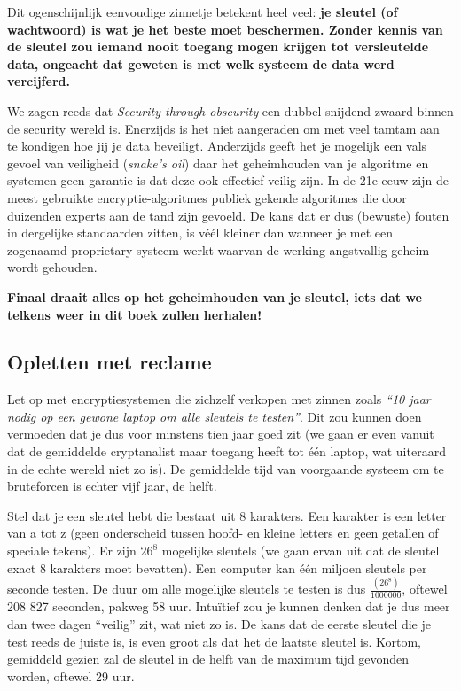\documentclass[
  10pt,
  dutch,
  paper=a4,
  ,captions=tableheading
]{scrbook}
\begin{document}
Dit ogenschijnlijk eenvoudige zinnetje betekent heel veel: \textbf{je
sleutel (of wachtwoord) is wat je het beste moet beschermen. Zonder
kennis van de sleutel zou iemand nooit toegang mogen krijgen tot
versleutelde data, ongeacht dat geweten is met welk systeem de data werd
vercijferd.}

We zagen reeds dat \emph{Security through obscurity} een dubbel snijdend
zwaard binnen de security wereld is. Enerzijds is het niet aangeraden om
met veel tamtam aan te kondigen hoe jij je data beveiligt. Anderzijds
geeft het je mogelijk een vals gevoel van veiligheid (\emph{snake's
oil}) daar het geheimhouden van je algoritme en systemen geen garantie
is dat deze ook effectief veilig zijn. In de 21e eeuw zijn de meest
gebruikte encryptie-algoritmes publiek gekende algoritmes die door
duizenden experts aan de tand zijn gevoeld. De kans dat er dus (bewuste)
fouten in dergelijke standaarden zitten, is véél kleiner dan wanneer je
met een zogenaamd proprietary systeem werkt waarvan de werking
angstvallig geheim wordt gehouden.

\textbf{Finaal draait alles op het geheimhouden van je sleutel, iets dat
we telkens weer in dit boek zullen herhalen!}

\subsection{Opletten met reclame}\label{opletten-met-reclame}

Let op met encryptiesystemen die zichzelf verkopen met zinnen zoals
\emph{``10 jaar nodig op een gewone laptop om alle sleutels te
testen''}. Dit zou kunnen doen vermoeden dat je dus voor minstens tien
jaar goed zit (we gaan er even vanuit dat de gemiddelde cryptanalist
maar toegang heeft tot één laptop, wat uiteraard in de echte wereld niet
zo is). De gemiddelde tijd van voorgaande systeem om te bruteforcen is
echter vijf jaar, de helft.

Stel dat je een sleutel hebt die bestaat uit 8 karakters. Een karakter
is een letter van a tot z (geen onderscheid tussen hoofd- en kleine
letters en geen getallen of speciale tekens). Er zijn \(26^8\) mogelijke
sleutels (we gaan ervan uit dat de sleutel exact 8 karakters moet
bevatten). Een computer kan één miljoen sleutels per seconde testen. De
duur om alle mogelijke sleutels te testen is dus
\(\frac{(26^8)}{1 000 000}\), oftewel 208 827 seconden, pakweg 58 uur.
Intuïtief zou je kunnen denken dat je dus meer dan twee dagen ``veilig''
zit, wat niet zo is. De kans dat de eerste sleutel die je test reeds de
juiste is, is even groot als dat het de laatste sleutel is. Kortom,
gemiddeld gezien zal de sleutel in de helft van de maximum tijd gevonden
worden, oftewel 29 uur.
\end{document}
